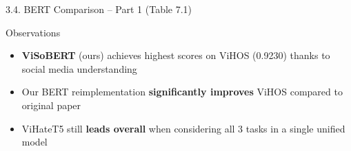 \documentclass[11pt, aspectratio=169]{beamer}
\begin{document}
\begin{frame}[shrink=8]{3.4. BERT Comparison -- Part 1 (Table 7.1)}

\begin{table}[h]
  \centering
  \caption{BERT architecture model results (selected)}
  \vspace{0.2cm}
\end{table}

\begin{block}{Observations}
  \begin{itemize}
    \item \textbf{ViSoBERT} (ours) achieves highest scores on ViHOS (0.9230) thanks to social media understanding
    \item Our BERT reimplementation \textbf{significantly improves} ViHOS compared to original paper
    \item ViHateT5 still \textbf{leads overall} when considering all 3 tasks in a single unified model
  \end{itemize}
\end{block}
\end{frame}
\end{document}

